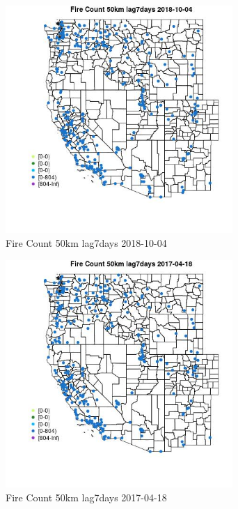 \begin{figure} 
\centering  
\includegraphics[width=0.77\textwidth]{Code_Outputs/Report_ML_input_PM25_Step4_part_f_de_duplicated_aveswNAs_MapObsFire_Count_50km_lag7days2018-10-04.jpg} 
\caption{\label{fig:Report_ML_input_PM25_Step4_part_f_de_duplicated_aveswNAsMapObsFire_Count_50km_lag7days2018-10-04}Fire Count 50km lag7days 2018-10-04} 
\end{figure} 
 

\begin{figure} 
\centering  
\includegraphics[width=0.77\textwidth]{Code_Outputs/Report_ML_input_PM25_Step4_part_f_de_duplicated_aveswNAs_MapObsFire_Count_50km_lag7days2017-04-18.jpg} 
\caption{\label{fig:Report_ML_input_PM25_Step4_part_f_de_duplicated_aveswNAsMapObsFire_Count_50km_lag7days2017-04-18}Fire Count 50km lag7days 2017-04-18} 
\end{figure} 
 

